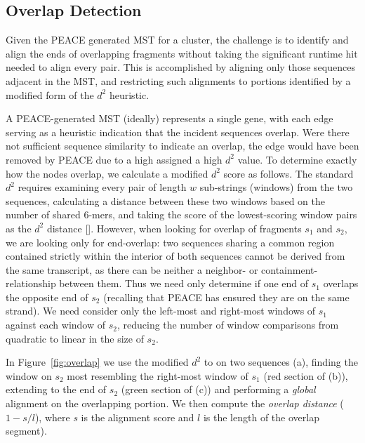 \documentclass{bioinfo}
\newcommand{\peace} {{\small PEACE}}
\begin{document}
\subsection*{Overlap Detection}

Given the \peace\/ generated MST for a cluster, the challenge is to
identify and align the ends of overlapping fragments without taking
the significant runtime hit needed to align every pair.  This is
accomplished by aligning only those sequences adjacent in the MST, and
restricting such alignments to portions identified by a modified form
of the $d^2$ heuristic.


A \peace-generated MST (ideally) represents a single gene, with each
edge serving as a heuristic indication that the incident sequences
overlap.  Were there not sufficient sequence similarity to indicate an
overlap, the edge would have been removed by \peace\/ due to a high
assigned a high $d^2$ value.  To determine exactly how the nodes
overlap, we calculate a modified $d^2$ score as follows.  The standard
$d^2$ requires examining every pair of length $w$ sub-strings
(windows) from the two sequences, calculating a distance between these
two windows based on the number of shared 6-mers, and taking the score
of the lowest-scoring window pairs as the $d^2$ distance
[\cite{Hide94}].  However, when looking for overlap of fragments $s_1$
and $s_2$, we are looking only for end-overlap: two sequences sharing
a common region contained strictly within the interior of both
sequences cannot be derived from the same transcript, as there can be
neither a neighbor- or containment-relationship between them.  Thus we
need only determine if one end of $s_1$ overlaps the opposite end of
$s_2$ (recalling that \peace\/ has ensured they are on the same
strand).  We need consider only the left-most and right-most windows
of $s_1$ against each window of $s_2$, reducing the number of window
comparisons from quadratic to linear in the size of $s_2$.


In Figure~\ref{fig:overlap} we use the modified $d^2$ to on two
sequences (a), finding the window on $s_2$ most resembling the right-most
window of $s_1$ (red section of (b)), extending to the end of $s_2$
(green section of (c)) and performing a {\it global} alignment on the
overlapping portion.  We then compute the {\it overlap distance} ($1 -
s/l$), where $s$ is the alignment score and $l$ is the length of the
overlap segment).
\end{document}

